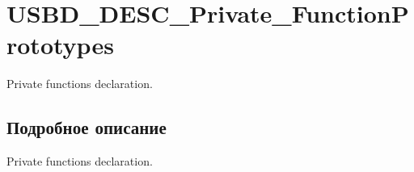 \hypertarget{group___u_s_b_d___d_e_s_c___private___function_prototypes}{
\section{USBD\_\-DESC\_\-Private\_\-FunctionPrototypes}
\label{group___u_s_b_d___d_e_s_c___private___function_prototypes}
}
Private functions declaration.  




\subsection{Подробное описание}
Private functions declaration. 